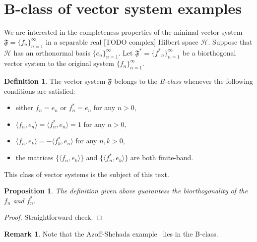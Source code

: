 \documentclass[12pt]{article}
\newcommand\inner[2]{\langle #1, #2 \rangle}
\renewcommand{\cal}[1]{\mathcal{#1}}
\newtheorem{prop}{Proposition}
\theoremstyle{definition}
\newtheorem{remark}{Remark}
\newtheorem{definition}{Definition}
\newcommand{\seq}[1]{\{{#1}_n\}_{n=1}^\infty}
\newcommand{\fsys}{\mathfrak{F}}
\newcommand{\fstarsys}{\mathfrak{F^*}}
\numberwithin{remark}{section}
\numberwithin{theorem}{section}
\numberwithin{prop}{section}
\numberwithin{equation}{section}
\numberwithin{lemma}{section}
\numberwithin{prop_under_lemma}{lemma}
\begin{document}


\section{B-class of vector system examples}
    We are interested in the completeness properties of the minimal vector system $\fsys = \seq{f}$
      in a separable real [TODO complex] Hilbert space $\cal{H}$.
    Suppose that $\cal{H}$ has an orthonormal basis $\seq{e}$.
    Let $\fstarsys = \seq{f^*}$ be a biorthogonal vector system to the original system $\seq{f}$.
    \begin{definition}
        The vector system $\fsys$ belongs to the \textit{B-class} whenever the following conditions are satisfied:
        \begin{itemize}
            \item either $f_n = e_n$ or $f^*_n = e_n$ for any $n > 0$,
            \item $\inner{f_n}{e_n} = \inner{f^*_n}{e_n} = 1$ for any $n > 0$,
            \item $\inner{f_n}{e_k} = -\inner{f^*_k}{e_n}$ for any $n, k > 0$,
            \item the matrices $\{\inner{f_n}{e_k}\}$ and $\{\inner{f^*_n}{e_k}\}$ are both finite-band.
        \end{itemize}
    \end{definition}
    This class of vector systems is the subject of this text.
    \begin{prop}
        The definition given above guarantess the biorthogonality of the $f_n$ and $f^*_n$.
    \end{prop}
    \begin{proof}
        Straightforward check.
    \end{proof}
    \begin{remark}
        Note that the Azoff-Shehada example~\cite{azoff} lies in the B-class.
    \end{remark}
    
\end{document}

